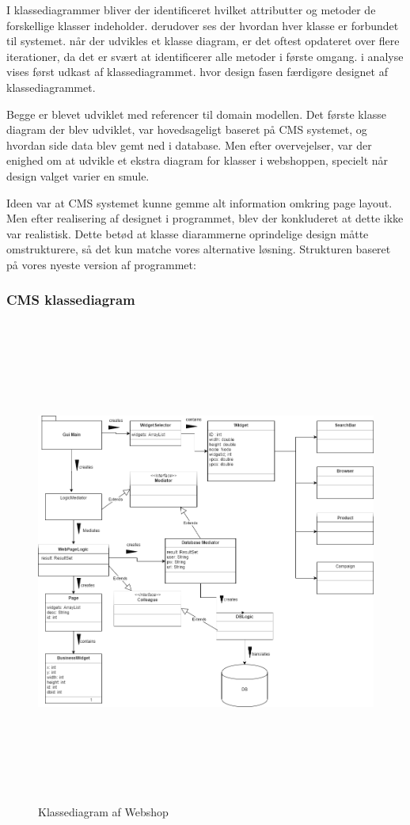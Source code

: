 I klassediagrammer bliver der identificeret hvilket attributter og metoder de forskellige klasser indeholder. derudover ses der hvordan hver klasse er forbundet til systemet. når der udvikles et klasse diagram, er det oftest opdateret over flere iterationer, da det er svært at identificerer alle metoder i første omgang. i analyse vises først udkast af klassediagrammet. hvor design fasen færdigøre designet af klassediagrammet. 

Begge er blevet udviklet med referencer til domain modellen. Det første klasse diagram der blev udviklet, var hovedsageligt baseret på CMS systemet, og hvordan side data blev gemt ned i database. Men efter overvejelser, var der enighed om at udvikle et ekstra diagram for klasser i webshoppen, specielt når design valget varier en smule. 

Ideen var at CMS systemet kunne gemme alt information omkring page layout. Men efter realisering af designet i programmet, blev der konkluderet at dette ikke var realistisk. Dette betød at klasse diarammerne oprindelige design måtte omstrukturere, så det kun matche vores alternative løsning. Strukturen baseret på vores nyeste version af programmet:
\subsubsection{CMS klassediagram}

\begin{figure}[H]
  \includegraphics[width=14cm, height=16cm]{elaborationsdokumentet/figurer/analyse/Copy_of_WebshopUML.png}
  \caption{Klassediagram af Webshop}
  \label{fig:Classdiagram-CMS}
\end{figure}

